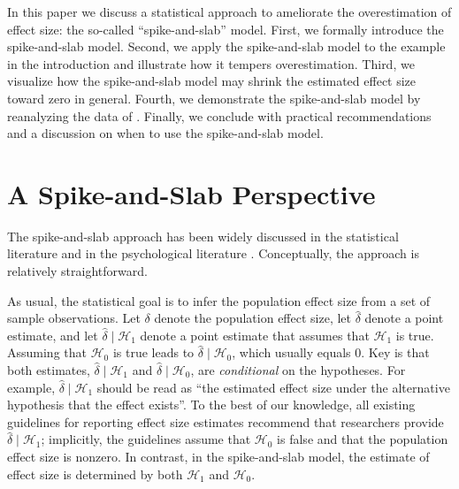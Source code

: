 \documentclass[a4paper]{article}
\newcommand{\hypo}[1]{\ensuremath{\mathcal{H}_{#1}}}
\newcommand{\popDelta}{\delta}
\newcommand{\obsDelta}{\hat{\delta}}
\newenvironment{revision}{\color{teal}}{\color{black}}
\begin{document}
\begin{revision}%
In this paper we discuss a statistical approach to ameliorate the overestimation of effect size: the so-called ``spike-and-slab'' model. First, we formally introduce the spike-and-slab model.
Second, we apply the spike-and-slab model to the example in the introduction and illustrate how it tempers overestimation.
Third, we visualize how the spike-and-slab model may shrink the estimated effect size toward zero in general.
Fourth, we demonstrate the spike-and-slab model by reanalyzing the data of \textcite{heycke2018two}.
Finally, we conclude with practical recommendations and a discussion on when to use the spike-and-slab model.
\end{revision}


\section*{A Spike-and-Slab Perspective}
\begin{revision}%
The spike-and-slab approach has been widely discussed in the statistical literature \parencite[e.g.,][]{ohara2009review, ishwaran2005spike, geweke1996variable, clyde1996prediction, mitchell1988bayesian} and in the psychological literature \parencite[e.g.,][]{IversonEtAl2010, yu2018bayesian, RouderEtAl2018PBR, bainter2020improving}.
Conceptually, the approach is relatively straightforward.
	
As usual, the statistical goal is to infer the population effect size from a set of sample observations. Let $\popDelta$ denote the population effect size, let $\obsDelta$ denote a point estimate, and let $\obsDelta\mid\hypo{1}$ denote a point estimate that assumes that \hypo{1} is true.
Assuming that \hypo{0} is true leads to $\obsDelta\mid\hypo{0}$, which usually equals 0.
Key is that both estimates, $\obsDelta\mid\hypo{1}$ and $\obsDelta\mid\hypo{0}$, are \emph{conditional} on the hypotheses. 
For example, $\obsDelta\mid\hypo{1}$ should be read as ``the estimated effect size under the alternative hypothesis that the effect exists''. To the best of our knowledge, all existing guidelines for reporting effect size estimates recommend that researchers provide $\obsDelta\mid\hypo{1}$; implicitly, the guidelines assume that \hypo{0} is false and that the population effect size is nonzero. In contrast, in the spike-and-slab model, the estimate of effect size is determined by both \hypo{1} and \hypo{0}. 

\end{revision}%
\end{document}
